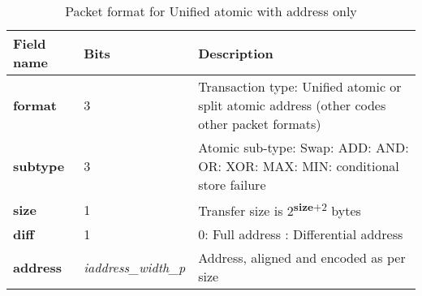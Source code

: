 \begin{table}[htp]
  \centering
  \caption{Packet format for Unified atomic with address only}
  \label{tab:te_datadx0y6}
  \begin{tabulary}{\textwidth}{|l|p{40mm}|p{90mm}|}
    \hline
    {\bf Field name} & {\bf Bits} & {\bf Description} \\
    \hline
    \textbf{format} & 	3	& Transaction type: Unified atomic or split atomic address\newline	
		(other codes other packet formats)\\
    \hline
    \textbf{subtype} & 	3	& Atomic sub-type: Swap: ADD: AND: OR: XOR: MAX: MIN: conditional store failure\\	
    \hline
    \textbf{size} & 1 & Transfer size is 2\textsuperscript{\textbf{size}+2} bytes\\
    \hline
    \textbf{diff} & 1 & 0: Full address : Differential address\\
    \hline
    \textbf{address} &  \textit{iaddress\_width\_p} & Address, aligned and encoded as per size \\
    \hline
  \end{tabulary}
\end{table}


